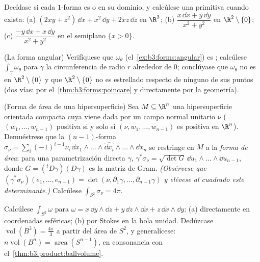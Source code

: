 \begin{exercise}[$\star\star$]\label{exo:b3:forms:3}
Decídase si cada $1$-forma es 
o  en su dominio, y calcúlese
una primitiva cuando exista: (a)
$(2xy + z^2)\,\dd x + x^2\,\dd y + 2xz\,\dd z$ en
$\R^3$;
(b) $\dfrac{x\,\dd x + y\,\dd y}{x^2 + y^2}$ en
$\R^2\setminus\{0\}$;
(c) $\dfrac{-y\,\dd x + x\,\dd y}{x^2 + y^2}$ en el semiplano
$\{x > 0\}$.
\end{exercise}

\begin{exercise}[$\star\star$]\label{exo:b3:forms:4}
(La forma angular) Verifíquese que $\omega_\theta$
(el~\cref{ex:b3:forms:angular}) es
; calcúlese
$\int_\gamma\omega_\theta$ para $\gamma$ la circunferencia de radio $r$
alrededor de $0$; conclúyase que $\omega_\theta$ no es
 en $\R^2\setminus\{0\}$ y que
$\R^2\setminus\{0\}$ no es estrellado respecto de ninguno de sus puntos
(dos vías: por el~\cref{thm:b3:forms:poincare} y directamente por la
geometría).
\end{exercise}

\begin{exercise}[$\star\star$]\label{exo:b3:forms:5}
(Forma de área de una hipersuperficie) Sea $M \subseteq \R^n$ una
hipersuperficie orientada compacta
cuya  viene dada por un
campo normal unitario $\nu$ ($(w_1, \dots, w_{n-1})$ positiva si y solo
si $(\nu, w_1, \dots, w_{n-1})$ es positiva en $\R^n$). Demuéstrese que
la $(n-1)$-forma $\sigma_\nu =
\sum_i(-1)^{i-1}\nu_i\,\dd x_1\wedge\dots\wedge\widehat{\dd
x_i}\wedge\dots\wedge\dd x_n$ se restringe en $M$ a la \emph{forma de
área}: para una parametrización directa $\gamma$,
$\gamma^*\sigma_\nu = \sqrt{\det G}\,\dd u_1\wedge\dots
\wedge\dd u_{n-1}$, donde $G = ({}^t D\gamma)(D\gamma)$ es la matriz de
Gram. \emph{(Obsérvese que
$(\gamma^*\sigma_\nu)(e_1, \dots, e_{n-1}) = \det(\nu,
\partial_1\gamma, \dots, \partial_{n-1}\gamma)$ y elévese al cuadrado
este determinante.)} Calcúlese $\int_{S^2}\sigma_\nu = 4\pi$.
\end{exercise}

\begin{exercise}[$\star\star$]\label{exo:b3:forms:6}
Calcúlese $\int_{S^2}\omega$ para $\omega = x\,\dd y\wedge\dd z
+ y\,\dd z\wedge\dd x + z\,\dd x\wedge\dd y$: (a) directamente en
coordenadas esféricas; (b) por Stokes en la bola unidad. Dedúzcase
$\operatorname{vol}(B^3) = \frac{4\pi}3$ a partir del área de $S^2$, y
generalícese:
$n\operatorname{vol}(B^n) = \operatorname{area}(S^{n-1})$,
en consonancia con el~\cref{thm:b3:product:ballvolume}.
\end{exercise}

